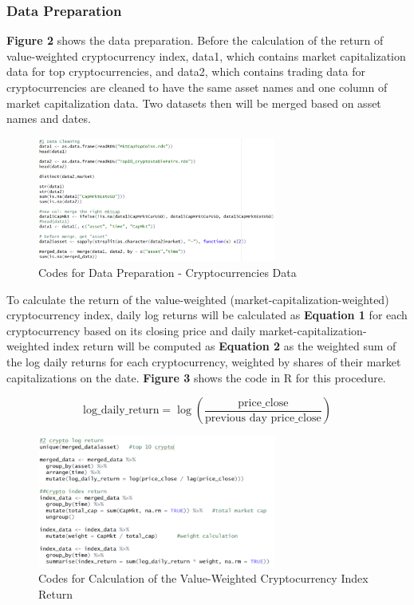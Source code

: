 \documentclass{article}
\begin{document}
\subsubsection{Data Preparation}
{\bf Figure 2} shows the data preparation. Before the calculation of the return of value-weighted cryptocurrency index, data1, which contains market capitalization data for top cryptocurrencies, and data2, which contains trading data for cryptocurrencies are cleaned to have the same asset names and one column of market capitalization data. Two datasets then will be merged based on asset names and dates.

\begin{figure}[h]
    \centering
    \includegraphics[width=0.7\textwidth]{2.png}
    \caption{Codes for Data Preparation - Cryptocurrencies Data} 
    \label{Codes for Data Preparation}
\end{figure}

To calculate the return of the value-weighted (market-capitalization-weighted) cryptocurrency index, daily log returns will be calculated as {\bf Equation 1} for each cryptocurrency based on its closing price and daily market-capitalization-weighted index return will be computed as {\bf Equation 2} as the weighted sum of the log daily returns for each cryptocurrency, weighted by shares of their market capitalizations on the date. {\bf Figure 3} shows the code in R for this procedure.

\[
\text{log\_daily\_return} = \log\left(\frac{\text{price\_close}}{\text{previous day price\_close}}\right) \tag{Equation 1}
\]

\begin{figure}[h]
    \centering
    \includegraphics[width=0.7\textwidth]{3.png}
    \caption{Codes for Calculation of the Value-Weighted Cryptocurrency Index Return} 
    \label{Codes for Calculation of the Value-Weighted Cryptocurrency Index Return}
\end{figure}
\end{document}
